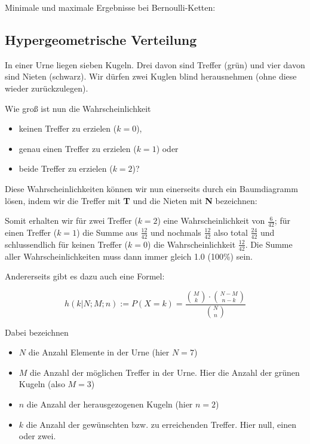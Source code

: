 
Minimale und maximale Ergebnisse bei Bernoulli-Ketten:

\newpage



\subsection{Hypergeometrische Verteilung}
In einer Urne liegen sieben Kugeln. Drei davon sind Treffer (grün) und vier davon sind Nieten (schwarz).
Wir dürfen zwei Kuglen blind herausnehmen (ohne diese wieder zurückzulegen).


Wie groß ist nun die Wahrscheinlichkeit
\begin{itemize}
\item keinen Treffer zu erzielen ($k=0$),
\item genau einen Treffer zu erzielen ($k=1$) oder
\item beide Treffer zu erzielen ($k=2$)?
\end{itemize}

Diese Wahrscheinlichkeiten können wir nun einerseits durch ein Baumdiagramm lösen, indem wir die Treffer mit \textbf{T} und die Nieten mit \textbf{N} bezeichnen:


Somit erhalten wir für zwei Treffer ($k=2$) eine Wahrscheinlichkeit von $\frac{6}{42}$; für einen Treffer ($k=1$) die Summe aus $\frac{12}{42}$ und nochmals $\frac{12}{42}$ also total $\frac{24}{42}$ und schlussendlich für keinen Treffer ($k=0$) die Wahrscheinlichkeit $\frac{12}{42}$.
Die Summe aller Wahrscheinlichkeiten muss dann immer gleich 1.0 (100\%) sein.
\newpage



Andererseits gibt es dazu auch eine Formel:

$$h(k|N;M;n) := P(X=k) = \frac{ {M\choose k} \cdot{} {{N-M}\choose {n-k}}}{{N \choose n}}$$

Dabei bezeichnen
\begin{itemize}
\item $N$ die Anzahl Elemente in der Urne (hier $N = 7$)
\item $M$ die Anzahl der möglichen Treffer in der Urne. Hier die Anzahl der grünen Kugeln (also $M = 3$)
\item $n$ die Anzahl der herausgezogenen Kugeln (hier $n = 2$)
\item $k$ die Anzahl der gewünschten bzw. zu erreichenden Treffer. Hier \zB null, einen oder zwei.
\end{itemize}
\newpage


